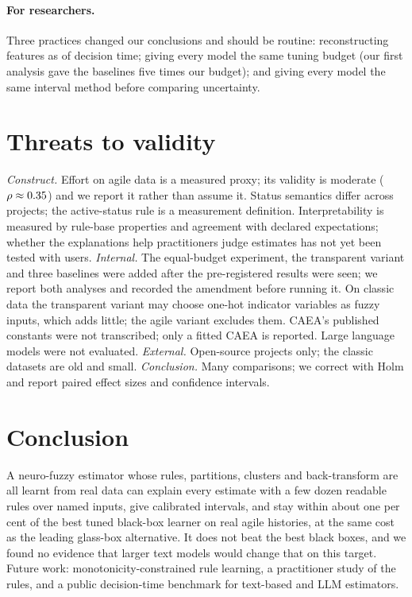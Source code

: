 \documentclass[preprint,12pt,authoryear]{elsarticle}
\begin{document}
\paragraph{For researchers.}  Three practices changed our conclusions and should be routine: reconstructing features
as of decision time; giving every model the same tuning budget (our first analysis gave the baselines five times our
budget); and giving every model the same interval method before comparing uncertainty.

\section{Threats to validity}
\label{sec:threats}
\emph{Construct.}  Effort on agile data is a measured proxy; its validity is moderate ($\rho\approx0.35$) and we
report it rather than assume it.  Status semantics differ across projects; the active-status rule is a measurement
definition.  Interpretability is measured by rule-base properties and agreement with declared expectations; whether
the explanations help practitioners judge estimates has not yet been tested with users.
\emph{Internal.}  The equal-budget experiment, the transparent variant and three baselines were added after the
pre-registered results were seen;
we report both analyses and recorded the amendment before running it.  On classic data the transparent variant may
choose one-hot indicator variables as fuzzy inputs, which adds little; the agile variant excludes them.  CAEA's
published constants were not transcribed; only a fitted CAEA is reported.  Large language models were not evaluated.
\emph{External.}  Open-source projects only; the classic datasets are old and small.
\emph{Conclusion.}  Many comparisons; we correct with Holm and report paired effect sizes and confidence intervals.

\section{Conclusion}
\label{sec:conclusion}
A neuro-fuzzy estimator whose rules, partitions, clusters and back-transform are all learnt from real data can explain
every estimate with a few dozen readable rules over named inputs, give calibrated intervals, and stay within about one
per cent of the best tuned black-box learner on real agile histories, at the same cost as the leading glass-box
alternative.  It does not beat the best black boxes, and we found no evidence that larger text models would change
that on this target.  Future work: monotonicity-constrained rule learning, a practitioner study of the rules, and a
public decision-time benchmark for text-based and LLM estimators.
\end{document}
